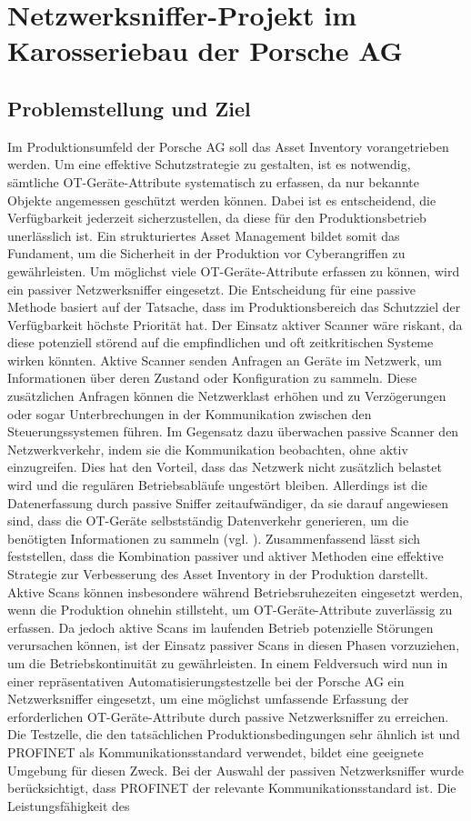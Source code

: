\section{Netzwerksniffer-Projekt im Karosseriebau der Porsche AG}

\subsection{Problemstellung und Ziel}
Im Produktionsumfeld der Porsche AG soll das Asset Inventory vorangetrieben werden. Um eine effektive Schutzstrategie zu gestalten, ist es notwendig, sämtliche OT-Geräte-Attribute systematisch zu erfassen, da nur bekannte Objekte angemessen geschützt werden können. Dabei ist es entscheidend, die Verfügbarkeit jederzeit sicherzustellen, da diese für den Produktionsbetrieb unerlässlich ist. Ein strukturiertes Asset Management bildet somit das Fundament, um die Sicherheit in der Produktion vor Cyberangriffen zu gewährleisten. Um möglichst viele OT-Geräte-Attribute erfassen zu können, wird ein passiver Netzwerksniffer eingesetzt. Die Entscheidung für eine passive Methode basiert auf der Tatsache, dass im Produktionsbereich das Schutzziel der Verfügbarkeit höchste Priorität hat. Der Einsatz aktiver Scanner wäre riskant, da diese potenziell störend auf die empfindlichen und oft zeitkritischen Systeme wirken könnten. Aktive Scanner senden Anfragen an Geräte im Netzwerk, um Informationen über deren Zustand oder Konfiguration zu sammeln. Diese zusätzlichen Anfragen können die Netzwerklast erhöhen und zu Verzögerungen oder sogar Unterbrechungen in der Kommunikation zwischen den Steuerungssystemen führen. Im Gegensatz dazu überwachen passive Scanner den Netzwerkverkehr, indem sie die Kommunikation beobachten, ohne aktiv einzugreifen. Dies hat den Vorteil, dass das Netzwerk nicht zusätzlich belastet wird und die regulären Betriebsabläufe ungestört bleiben. Allerdings ist die Datenerfassung durch passive Sniffer zeitaufwändiger, da sie darauf angewiesen sind, dass die OT-Geräte selbstständig Datenverkehr generieren, um die benötigten Informationen zu sammeln (vgl. \cite{aktivScan}). Zusammenfassend lässt sich feststellen, dass die Kombination passiver und aktiver Methoden eine effektive Strategie zur Verbesserung des Asset Inventory in der Produktion darstellt. Aktive Scans können insbesondere während Betriebsruhezeiten eingesetzt werden, wenn die Produktion ohnehin stillsteht, um OT-Geräte-Attribute zuverlässig zu erfassen. Da jedoch aktive Scans im laufenden Betrieb potenzielle Störungen verursachen können, ist der Einsatz passiver Scans in diesen Phasen vorzuziehen, um die Betriebskontinuität zu gewährleisten. In einem Feldversuch wird nun in einer repräsentativen Automatisierungstestzelle bei der Porsche AG ein Netzwerksniffer eingesetzt, um eine möglichst umfassende Erfassung der erforderlichen OT-Geräte-Attribute durch passive Netzwerksniffer zu erreichen. Die Testzelle, die den tatsächlichen Produktionsbedingungen sehr ähnlich ist und PROFINET als Kommunikationsstandard verwendet, bildet eine geeignete Umgebung für diesen Zweck. Bei der Auswahl der passiven Netzwerksniffer wurde berücksichtigt, dass PROFINET der relevante Kommunikationsstandard ist. Die Leistungsfähigkeit des 